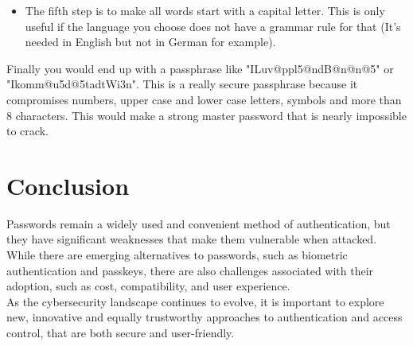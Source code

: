 \documentclass[conference]{IEEEtran}
\begin{document}
\begin{enumerate}
\begin{itemize}
\item The fifth step is to make all words start with a capital letter. This is only useful if the language you choose does not have a grammar rule for that (It's needed in English but not in German for example). 
\end{itemize}
Finally you would end up with a passphrase like "ILuv@ppl5@ndB@n@n@5" or "Ikomm@u5d@5tadtWi3n". This is a really secure passphrase because it compromises numbers, upper case and lower case letters, symbols and more than 8 characters. This would make a strong master password that is nearly impossible to crack.
\end{enumerate}


\section{Conclusion}
Passwords remain a widely used and convenient method of authentication, but they have significant weaknesses that make them vulnerable when attacked. While there are emerging alternatives to passwords, such as biometric authentication and passkeys, there are also challenges associated with their adoption, such as cost, compatibility, and user experience.\\
As the cybersecurity landscape continues to evolve, it is important to explore new, innovative and equally trustworthy approaches to authentication and access control, that are both secure and user-friendly.


\listoffigures
\end{document}
